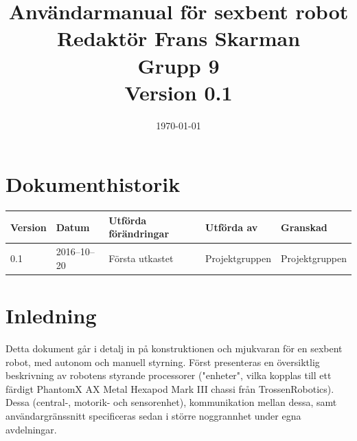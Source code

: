 \documentclass[a4paper,titlepage,12pt]{article}
\begin{document}
\listoftodos
	\title{\LARGE
		\textbf{Användarmanual för sexbent robot} \\
		\vspace*{0.5\baselineskip}
		\large
		Redaktör Frans Skarman \\
		Grupp 9 \\
		\small
		\vspace*{0.5\baselineskip}
		Version 0.1}

	\date{\today}

	\maketitle
	
	\newpage

	\tableofcontents
	\newpage



	\section*{Dokumenthistorik}
	\renewcommand*{\arraystretch}{1.4}
    \begin{longtable}[c]{ l l >{\raggedright}p{5cm} >{\raggedright}p{3cm} l }
		\textbf{Version} & \textbf{Datum} & \textbf{Utförda förändringar} 
		& \textbf{Utförda av} & \textbf{Granskad} \\ \midrule
		
		0.1 & 2016--10--20 & Första utkastet & Projektgruppen &
        Projektgruppen \\
            
	\end{longtable}


	\newpage

	\raggedright

	\section{Inledning}
	Detta dokument går i detalj in på konstruktionen och mjukvaran för en
    sexbent robot, med autonom och manuell styrning. Först presenteras en
    översiktlig beskrivning av robotens styrande processorer ("enheter", vilka
    kopplas till ett färdigt PhantomX AX Metal Hexapod Mark III chassi från
    TrossenRobotics). Dessa (central-, motorik- och sensorenhet), kommunikation
    mellan dessa, samt användargränssnitt specificeras sedan i större
    noggrannhet under egna avdelningar.
\end{document}
